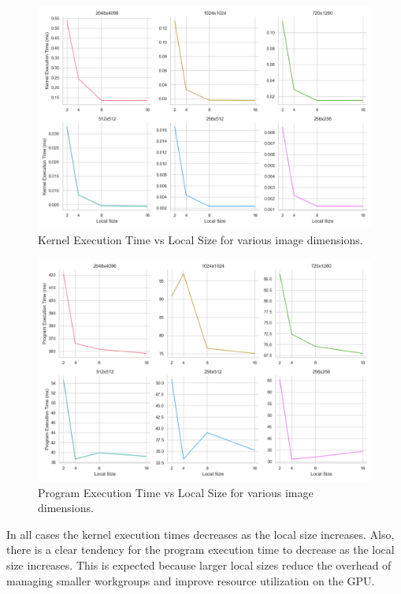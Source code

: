 \documentclass{article}
\begin{document}
\begin{figure}[h!]
    \centering
    \includegraphics[width=\textwidth]{./images/kernel_exec.png}
    \caption{Kernel Execution Time vs Local Size for various image dimensions.}
    \label{fig:kernel_exec}
\end{figure}

\begin{figure}[h!]
    \centering
    \includegraphics[width=\textwidth]{./images/program_exec.png}
    \caption{Program Execution Time vs Local Size for various image dimensions.}
    \label{fig:program_exec}
\end{figure}

In all cases the kernel execution times decreases as the local size increases. Also, there is a clear tendency for the program execution time to decrease as the local size increases. This is expected because larger local sizes reduce the overhead of managing smaller workgroups and improve resource utilization on the GPU.
\end{document}
